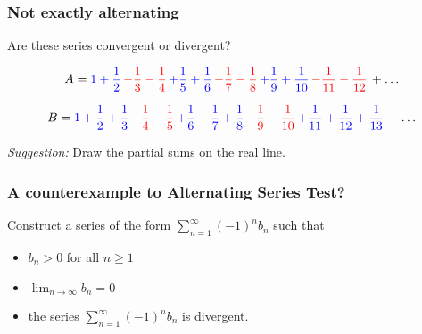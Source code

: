 \documentclass[14pt]{beamer}
\begin{document}
	\begin{frame}[t]
		\fontsize{13}{13}\selectfont
		\frametitle{Not exactly alternating}

		Are these series convergent or divergent?

		\[
			A ={\color{blue} 1 + \frac{1}{2}}\,{\color{red} - \frac{1}{3} - \frac{1}{4}}
			\,{\color{blue} + \frac{1}{5} + \frac{1}{6}}\,{\color{red} - \frac{1}{7} - \frac{1}{8}}
			\,{\color{blue} + \frac{1}{9} + \frac{1}{10}}\,{\color{red} - \frac{1}{11} - \frac{1}{12}}
			\, + \ldots
		\]

		\[
			B ={\color{blue} 1 + \frac{1}{2} + \frac{1}{3}}\,{\color{red} - \frac{1}{4} - \frac{1}{5}}
			\,{\color{blue} + \frac{1}{6} + \frac{1}{7} + \frac{1}{8}}\,{\color{red} - \frac{1}{9} - \frac{1}{10}}
			\,{\color{blue} + \frac{1}{11} + \frac{1}{12} + \frac{1}{13}}\, - \ldots
		\]
		\vspace{.2cm}

		\emph{Suggestion:} Draw the partial sums on the real line.
	\end{frame}

	\begin{frame}[t]
		\frametitle{A counterexample to Alternating Series Test?}

		Construct a series of the form
		$\displaystyle \sum_{n=1}^{\infty}(-1)^{n}b_{n}$ such that
		\begin{itemize}
			\item $\displaystyle b_{n}>0$ for all $n \geq 1$
				\vspace{.4cm}

			\item $\displaystyle \lim_{n \to \infty}b_{n}= 0$

			\item the series $\displaystyle \sum_{n=1}^{\infty}(-1)^{n}b_{n}$ is divergent.
		\end{itemize}
	\end{frame}



\end{document}
